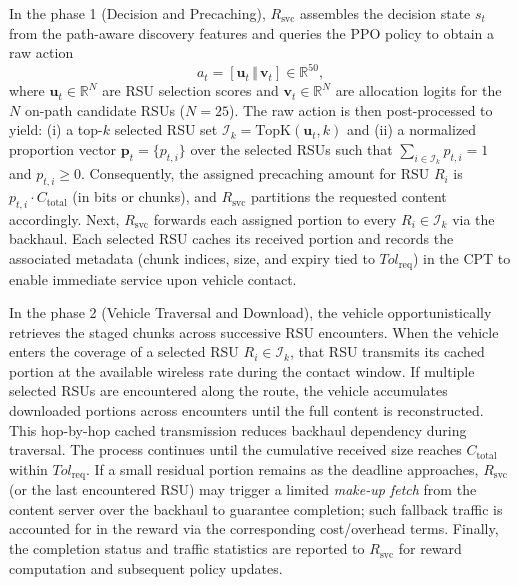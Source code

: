 In the phase 1 (Decision and Precaching), $R_{\text{svc}}$ assembles the decision state $s_t$ from the path-aware discovery features and queries the PPO policy to obtain a raw action
\[
a_t=[\mathbf{u}_t \,\Vert\, \mathbf{v}_t]\in\mathbb{R}^{50},
\]
where $\mathbf{u}_t\in\mathbb{R}^{N}$ are RSU selection scores and $\mathbf{v}_t\in\mathbb{R}^{N}$ are allocation logits for the $N$ on-path candidate RSUs ($N=25$). The raw action is then post-processed to yield: (i) a top-$k$ selected RSU set $\mathcal{I}_k=\mathrm{TopK}(\mathbf{u}_t,k)$ and (ii) a normalized proportion vector $\mathbf{p}_t=\{p_{t,i}\}$ over the selected RSUs such that $\sum_{i\in\mathcal{I}_k} p_{t,i}=1$ and $p_{t,i}\ge 0$. Consequently, the assigned precaching amount for RSU $R_i$ is $p_{t,i}\cdot C_{\text{total}}$ (in bits or chunks), and $R_{\text{svc}}$ partitions the requested content accordingly. Next, $R_{\text{svc}}$ forwards each assigned portion to every $R_i\in\mathcal{I}_k$ via the backhaul. Each selected RSU caches its received portion and records the associated metadata (chunk indices, size, and expiry tied to $Tol_{\text{req}}$) in the CPT to enable immediate service upon vehicle contact.

In the phase 2 (Vehicle Traversal and Download), the vehicle opportunistically retrieves the staged chunks across successive RSU encounters. When the vehicle enters the coverage of a selected RSU $R_i\in\mathcal{I}_k$, that RSU transmits its cached portion at the available wireless rate during the contact window. If multiple selected RSUs are encountered along the route, the vehicle accumulates downloaded portions across encounters until the full content is reconstructed. This hop-by-hop cached transmission reduces backhaul dependency during traversal. The process continues until the cumulative received size reaches $C_{\text{total}}$ within $Tol_{\text{req}}$. If a small residual portion remains as the deadline approaches, $R_{\text{svc}}$ (or the last encountered RSU) may trigger a limited \emph{make-up fetch} from the content server over the backhaul to guarantee completion; such fallback traffic is accounted for in the reward via the corresponding cost/overhead terms. Finally, the completion status and traffic statistics are reported to $R_{\text{svc}}$ for reward computation and subsequent policy updates.

